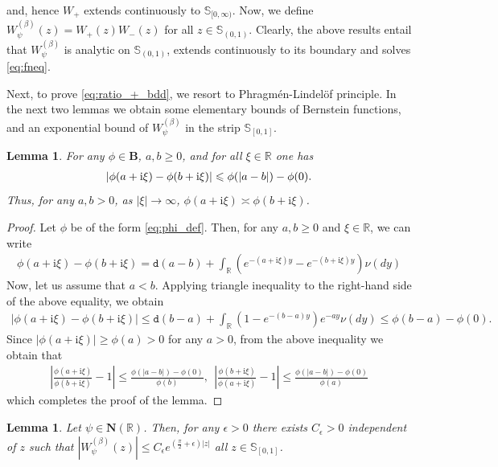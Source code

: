 \documentclass[12pt]{amsart}
\newcommand{\hlabel}{\phantomsection\label}
\numberwithin{equation}{section}
\newcommand{\bb}{\mathbb}
\renewcommand{\ge}{\geqslant}
\renewcommand{\le}{\leqslant}
\newcommand{\hpt}[2]{#2}
\newcommand{\ttt}{\mathtt}
\newcommand{\B}{\mathbf{B}}
\newcommand{\eps}{\epsilon}
\renewcommand{\i}{\mathrm{i}}
\newcommand{\NN}{\mathbf{N}}
\newtheorem{lem}[thm]{Lemma}
\theoremstyle{definition}
\theoremstyle{assump}
\theoremstyle{remark}
\begin{document}
and, hence $W_+$ extends continuously to $\bb{S}_{[0,\infty)}$. Now, we define $W^{(\beta)}_\psi(z)=W_+(z)W_-(z)$ for all $z\in\bb{S}_{(0,1)}$. Clearly, the above results entail that $W^{(\beta)}_\psi$ is analytic on $\bb{S}_{(0,1)}$, extends continuously to its boundary and solves \eqref{eq:fneq}. {Next, to prove \eqref{eq:ratio_+_bdd}, we resort to Phragm\'en-Lindel\"of principle. In the next two lemmas we obtain some elementary bounds of Bernstein functions, and an exponential bound of $W^{(\beta)}_\psi$ in the strip $\bb{S}_{[0,1]}$.
  	\begin{lem}\hlabel{lem:bound_bernstein}
  		For any $\phi\in\B$, $a,b\ge 0$, and for all $\xi\in\bb{R}$ one has
  		\begin{align}
  			|\phi(a+\i\xi)-\phi(b+\i\xi)|\le \phi(|a-b|)-\phi(0). \notag
  		\end{align}
  		Thus, for any $a,b>0$, as $|\xi|\to\infty$, $\phi(a+\i\xi)\asymp\phi(b+\i\xi)$.
  	\end{lem}
  	\begin{proof}
  		Let $\phi$ be of the form \eqref{eq:phi_def}. Then, for any $a,b\ge 0$ and $\xi\in\bb{R}$, we can write
  		\begin{align*}
  			\phi(a+\i\xi)-\phi(b+\i\xi)=\ttt{d}(a-b)+\int_{\bb{R}}\left(e^{-(a+\i\xi)y}-e^{-(b+\i\xi)y}\right)\nu(dy)
  		\end{align*}
  		Now, let us assume that $a<b$. Applying triangle inequality to the right-hand side of the above equality, we obtain
  		\begin{align*}
  			|\phi(a+\i\xi)-\phi(b+\i\xi)|\le \ttt{d}(b-a)+\int_{\bb{R}} (1-e^{-(b-a)y}) e^{-ay}\nu(dy)\le\phi(b-a)-\phi(0).
  		\end{align*}
  		Since $|\phi(a+\i\xi)|\ge \phi(a)>0$ for any $a>0$, from the above inequality we obtain that
  		\begin{align*}
  			\left|\frac{\phi(a+\i\xi)}{\phi(b+\i\xi)}-1\right|\le\frac{\phi(|a-b|)-\phi(0)}{\phi(b)}, \ \ \left|\frac{\phi(b+\i\xi)}{\phi(a+\i\xi)}-1\right|\le \frac{\phi(|a-b|)-\phi(0)}{\phi(a)}
  		\end{align*}
  		which completes the proof of the lemma.
  	\end{proof}
  \hpt{R22}{
  \begin{lem}\hlabel{lem:W_beta_bound}
  	Let $\psi\in\NN(\bb R)$. Then, for any $\epsilon>0$ there exists $C_\eps>0$ independent of $z$ such that $|W^{(\beta)}_\psi(z)|\le C_\eps e^{(\frac{\pi}{2}+\eps)|z|}$ all $z\in\bb{S}_{[0,1]}$.
  \end{lem}
}}
\end{document}
